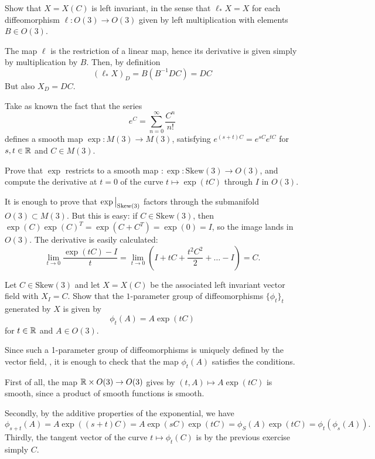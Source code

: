 \documentclass[11pt, english]{article}
\begin{document}
\begin{exc}
  Show that $X=X(C)$ is left invariant, in the sense that $\ell_\ast X = X$ for each diffeomorphism $\ell:O(3) \to O(3)$ given by left multiplication with elements $B \in O(3)$.
\end{exc}
\begin{sol}
 The map $\ell$ is the restriction of a linear map, hence its derivative is given simply by multiplication by $B$. Then, by definition
\[
(\ell_\ast X)_D = B(B^{-1}DC)=DC
\]
But also $X_D=DC$.
\end{sol}

Take as known the fact that the series
\[
e^C = \sum_{n=0}^\infty \frac{C^n}{n!}
\]
defines a smooth map $\exp:M(3) \to M(3)$, satisfying $e^{(s+t)C}=e^{sC}e^{tC}$ for $s,t \in \mathbb{R}$ and $C \in M(3)$. 

\begin{exc}
  Prove that $\exp$ restricts to a smooth map $:\exp:\mathrm{Skew}(3) \to O(3)$, and compute the derivative at $t = 0$ of the curve $t \mapsto \exp(tC)$ through $I$ in $O(3)$. 
\end{exc}
\begin{sol}
It is enough to prove that $\restr{\exp}{\mathrm{Skew}(3)}$ factors through the submanifold $O(3) \subset M(3)$. But this is easy: if $C \in \mathrm{Skew}(3)$, then $\exp(C)\exp(C)^T = \exp(C+C^T)=\exp(0)=I$, so the image lands in $O(3)$. The derivative is easily calculated:
\[
\lim_{t \to 0} \frac{\exp(tC)-I}{t} = \lim_{t \to 0}(I + tC + \frac{t^2C^2}{2} + \dotsc - I) = C.
\]
\end{sol}

\begin{exc}
  Let $C \in \mathrm{Skew}(3)$ and let $X=X(C)$ be the associated left invariant vector field with $X_I=C$. Show that the $1$-parameter group of diffeomorphisms $\{ \phi_t\}_t$ generated by $X$ is given by
\[
\phi_t(A) = A\exp(tC)
\]
for $t \in \mathbb{R}$ and $A \in O(3)$. 
\end{exc}
\begin{sol}
Since such a 1-parameter group of diffeomorphisms is uniquely defined by the vector field, , it is enough to check that the map $\phi_t(A)$ satisfies the conditions. 

First of all, the map $\mathbb{R} \times O(3) \to O(3)$ gives by $(t,A) \mapsto A \exp(tC)$ is smooth, since a product of smooth functions is smooth.

Secondly, by the additive properties of the exponential, we have
\[
\phi_{s+t}(A)=A\exp((s+t)C)=A\exp(sC)\exp(tC)=\phi_S(A)\exp(tC) = \phi_t(\phi_s(A)).
\]  
Thirdly, the tangent vector of the curve $t \mapsto \phi_t(C)$ is by the previous exercise simply $C$.
\end{sol}
\end{document}
